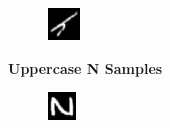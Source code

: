 \documentclass[conference]{IEEEtran}
\begin{document}
\begin{figure}[h]
\begin{subfigure}{.10\textwidth}
        \label{fig:issue_H03}
    \end{subfigure}%
    \begin{subfigure}{.10\textwidth}
        \centering
        \includegraphics[width=.90\textwidth]{./images/issues/H-05.png}
        \label{fig:issue_H04}
    \end{subfigure}\par\medskip
    \textbf{Uppercase N Samples}\par\medskip
    \begin{subfigure}{.10\textwidth}
        \centering
        \includegraphics[width=.90\textwidth]{./images/issues/N-0.png}

\end{subfigure}
\end{figure}
\end{document}
